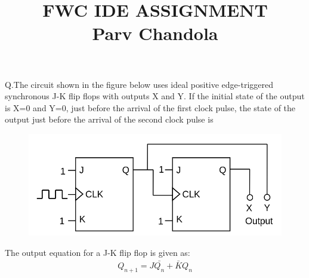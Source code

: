 \documentclass[journal,12pt,twocolumn]{IEEEtran}
\begin{document}
\let\StandardTheFigure\thefigure
\let\vec\mathbf
\renewcommand{\thefigure}{\theproblem}



\def\putbox#1#2#3{\makebox[0in][l]{\makebox[#1][l]{}\raisebox{\baselineskip}[0in][0in]{\raisebox{#2}[0in][0in]{#3}}}}
     \def\rightbox#1{\makebox[0in][r]{#1}}
     \def\centbox#1{\makebox[0in]{#1}}
     \def\topbox#1{\raisebox{-\baselineskip}[0in][0in]{#1}}
     \def\midbox#1{\raisebox{-0.5\baselineskip}[0in][0in]{#1}}

\title{FWC IDE ASSIGNMENT\\ \normalsize Parv Chandola}
\maketitle


Q.The circuit shown in the figure below uses ideal positive edge-triggered synchronous J-K flip flops with outputs X and Y. If the initial state of the output is X=0 and Y=0, just before the arrival of the first clock pulse, the state of the output just before the arrival of the second clock pulse is

\begin{figure}[!h]
	\begin{center} 
	    \includegraphics[width=\columnwidth]{figs/cir}
	\end{center}
\caption{}
\label{fig:Fig1}
\end{figure}

\solution

The output equation for a J-K flip flop is given as:
\begin{align}
Q_{n+1} = J\bar{Q_{n}} + \bar{K}Q_{n}
\end{align}
\end{document}
